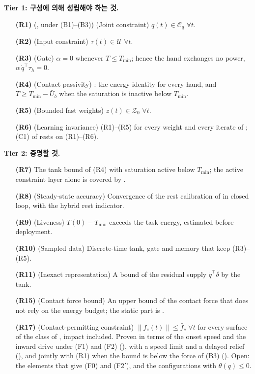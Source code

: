\documentclass[11pt]{article}\usepackage[margin=1in]{geometry}\usepackage{amsmath,amssymb,amsthm,mathtools}\usepackage{graphicx}\graphicspath{{figures/}{../figures/}{figs/}{./}}\usepackage{enumitem}\usepackage{hyperref}\usepackage{cleveref}\usepackage{tikz}\usetikzlibrary{arrows.meta,positioning,calc,shapes.geometric}\usepackage{float}\usepackage{rotating}\usepackage[most]{tcolorbox}\usepackage{kotex}\usepackage{booktabs}\usepackage{longtable}\emergencystretch=1.6em\tolerance=2000 \crefname{assumption}{Assumption}{Assumptions}\Crefname{assumption}{Assumption}{Assumptions}\crefname{definition}{Definition}{Definitions}\Crefname{definition}{Definition}{Definitions}\crefname{proposition}{Proposition}{Propositions}\Crefname{proposition}{Proposition}{Propositions}\crefname{fact}{Fact}{Facts}\Crefname{fact}{Fact}{Facts} \newtheorem{assumption}{Assumption}\newtheorem{definition}{Definition}\newtheorem{lemma}{Lemma}\newtheorem{proposition}{Proposition}\newtheorem{theorem}{Theorem}\newtheorem{corollary}{Corollary}\newtheorem{fact}{Fact}\theoremstyle{remark}\newtheorem{remark}{Remark} \newcommand{\R}{\mathbb{R}}\newcommand{\xb}{\bar x}\newcommand{\Ab}{\bar A}\newcommand{\By}{\bar B_y}\newcommand{\U}{\mathcal U}\newcommand{\Z}{\mathcal Z}
\begin{document}
\textbf{Tier 1: 구성에 의해 성립해야 하는 것.}
\begin{itemize}
\item[\textbf{(R1)}] (, under (B1)--(B3)) (Joint constraint) $q(t)\in\mathcal C_q$ $\forall t$.
\item[\textbf{(R2)}] (Input constraint) $\tau(t)\in\U$ $\forall t$.
\item[\textbf{(R3)}] (Gate) $\alpha=0$ whenever $T\le T_{\min}$; hence the hand exchanges no power, $\alpha\,\dot q^\top\tau_h=0$.
\item[\textbf{(R4)}] (Contact passivity) : the energy identity for every hand, and $T\ge T_{\min}-\bar U_b$ when the saturation is inactive below $T_{\min}$.
\item[\textbf{(R5)}] (Bounded fast weights) $z(t)\in\mathcal Z_0$ $\forall t$.
\item[\textbf{(R6)}] (Learning invariance) (R1)--(R5) for every weight and every iterate of ; (C1) of  rests on (R1)--(R6).
\end{itemize}

\textbf{Tier 2: 증명할 것.}
\begin{itemize}
\item[\textbf{(R7)}] The tank bound of (R4) with saturation active below $T_{\min}$; the active constraint layer alone is covered by .
\item[\textbf{(R8)}] (Steady-state accuracy) Convergence of the rest calibration of  in closed loop, with the hybrid rest indicator.
\item[\textbf{(R9)}] (Liveness) $T(0)-T_{\min}$ exceeds the task energy, estimated before deployment.
\item[\textbf{(R10)}] (Sampled data) Discrete-time tank, gate and memory that keep (R3)--(R5).
\item[\textbf{(R11)}] (Inexact representation) A bound of the residual supply $\dot q^\top\delta$ by the tank.
\item[\textbf{(R15)}] (Contact force bound) An upper bound of the contact force that does not rely on the energy budget; the static part is .
\item[\textbf{(R17)}] (Contact-permitting constraint) $\|f_e(t)\|\le\bar f_c$ $\forall t$ for every surface of the class of , impact included. Proven in terms of the onset speed and the inward drive under (F1) and (F2) (), with a speed limit and a delayed relief (), and jointly with (R1) when the bound is below the force of (B3) (). Open: the elements that give (F0) and (F2$'$), and the configurations with $\theta(q)\le0$.
\end{itemize}
\end{document}
